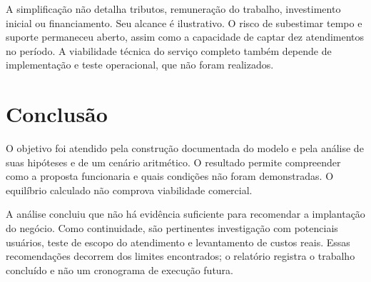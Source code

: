 A simplificação não detalha tributos, remuneração do trabalho, investimento
inicial ou financiamento. Seu alcance é ilustrativo. O risco de subestimar
tempo e suporte permaneceu aberto, assim como a capacidade de captar dez
atendimentos no período. A viabilidade técnica do serviço completo também
depende de implementação e teste operacional, que não foram realizados.

\chapter{Conclusão}
O objetivo foi atendido pela construção documentada do modelo e pela análise
de suas hipóteses e de um cenário aritmético. O resultado permite compreender
como a proposta funcionaria e quais condições não foram demonstradas.
O equilíbrio calculado não comprova viabilidade comercial.

A análise concluiu que não há evidência suficiente para recomendar a
implantação do negócio. Como continuidade, são pertinentes investigação
com potenciais usuários, teste de escopo do atendimento e levantamento de
custos reais. Essas recomendações decorrem dos limites encontrados; o
relatório registra o trabalho concluído e não um cronograma de execução futura.
